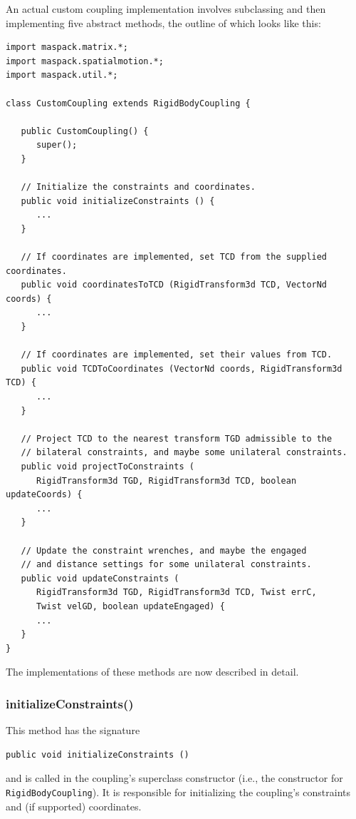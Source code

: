 An actual custom coupling implementation involves subclassing
 and then
implementing five abstract methods, the outline of which looks like
this:
%
\begin{lstlisting}[]
import maspack.matrix.*;
import maspack.spatialmotion.*;
import maspack.util.*;

class CustomCoupling extends RigidBodyCoupling {

   public CustomCoupling() {
      super();
   }

   // Initialize the constraints and coordinates.
   public void initializeConstraints () {
      ...
   }

   // If coordinates are implemented, set TCD from the supplied coordinates.
   public void coordinatesToTCD (RigidTransform3d TCD, VectorNd coords) {
      ...
   }

   // If coordinates are implemented, set their values from TCD.
   public void TCDToCoordinates (VectorNd coords, RigidTransform3d TCD) {
      ...
   }

   // Project TCD to the nearest transform TGD admissible to the
   // bilateral constraints, and maybe some unilateral constraints.
   public void projectToConstraints (
      RigidTransform3d TGD, RigidTransform3d TCD, boolean updateCoords) {
      ...
   }

   // Update the constraint wrenches, and maybe the engaged
   // and distance settings for some unilateral constraints.
   public void updateConstraints (
      RigidTransform3d TGD, RigidTransform3d TCD, Twist errC,
      Twist velGD, boolean updateEngaged) {
      ...
   }
}
\end{lstlisting}
%
The implementations of these methods are now described in detail.

\subsubsection*{initializeConstraints()}

This method has the signature
\begin{lstlisting}[]
  public void initializeConstraints ()
\end{lstlisting}
%
and is called in the coupling's superclass constructor (i.e., the
constructor for {\tt RigidBodyCoupling}).  It is responsible for
initializing the coupling's constraints and (if supported)
coordinates. 

